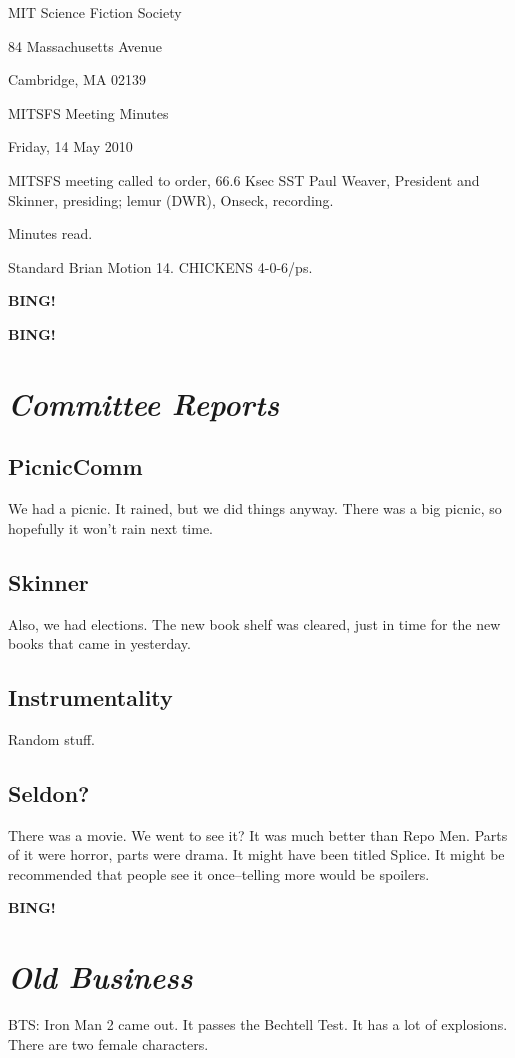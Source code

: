 \documentclass[10pt]{article}
\newcommand{\bing}{{\bf BING!} }
\newcommand{\goto}[1]{\bing \vskip 12pt \section*{{\em{#1}}}}
\newcommand{\skinner}{Paul Weaver, President and Skinner}
\newcommand{\onseck}{lemur (DWR), Onseck}
\newcommand{\meetingdate}{Friday, 14 May 2010}
\begin{document}
\begin{center}

MIT Science Fiction Society

84 Massachusetts Avenue

Cambridge, MA 02139

\vspace{12pt}

MITSFS Meeting Minutes

\meetingdate

\end{center}

\vspace{18pt}

\setlength{\parskip}{6pt}

\noindent
MITSFS meeting called to order, 66.6 Ksec SST 
\skinner, presiding; \onseck, recording.

Minutes read.

Standard Brian Motion 14.  CHICKENS 4-0-6/ps.

\bing

\goto{Committee Reports}

\subsection*{PicnicComm}
We had a picnic.  It rained, but we did things anyway.
There was a big picnic, so hopefully it won't rain next time.

\subsection*{Skinner}
Also, we had elections.  The new book shelf was cleared, just in time for the
new books that came in yesterday.

\subsection*{Instrumentality}
Random stuff.

\subsection*{Seldon?}
There was a movie.  We went to see it?  It was much better than Repo Men.
Parts of it were horror, parts were drama.  It might have been titled Splice.
It might be recommended that people see it once--telling more would be spoilers.


\goto{Old Business}

BTS: Iron Man 2 came out.  It passes the Bechtell Test.  It has a lot of 
explosions.  There are two female characters.
\end{document}
